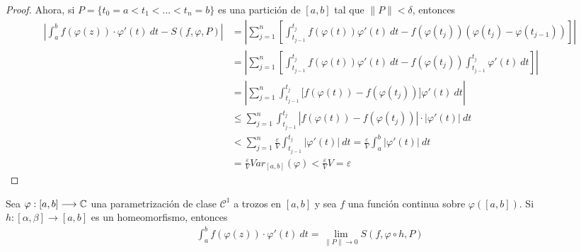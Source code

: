 \begin{proof}
    Ahora, si $P = \{t_0 = a < t_1 < ... < t_n = b\}$ es una partición de $[a,b]$ tal que $\|P\| < \delta$, entonces
    \begin{align*}
        \left| \int_{a}^{b}{f(\varphi(z))\cdot \varphi'(t) \ dt} - {S(f,\varphi,P)} \right| & = \left| \sum_{j=1}^{n} \left[ \int_{t_{j-1}}^{t_j} f(\varphi(t))\varphi'(t) \ dt - f(\varphi(t_j))(\varphi(t_j) - \varphi(t_{j-1})) \right] \right|     \\
                                                                                            & = \left| \sum_{j=1}^{n} \left[ \int_{t_{j-1}}^{t_j} f(\varphi(t))\varphi'(t) \ dt -f(\varphi(t_j))\int_{t_{j-1}}^{t_j}{\varphi'(t) \ dt} \right] \right| \\
                                                                                            & = \left| \sum_{j=1}^{n}  \int_{t_{j-1}}^{t_j} \Big[f(\varphi(t)) - f(\varphi(t_j))\Big]\varphi'(t) \ dt   \right|                                        \\
                                                                                            & \leq  \sum_{j=1}^{n}  \int_{t_{j-1}}^{t_j} |f(\varphi(t)) - f(\varphi(t_j))| \cdot |\varphi'(t)| \ dt                                                    \\
                                                                                            & <  \sum_{j=1}^{n}{\frac{\varepsilon}{V}\int_{t_{j-1}}^{t_j}|\varphi'(t)| \ dt} = \frac{\varepsilon}{V}\int_{a}^{b}{|\varphi'(t)| \ dt}                   \\
                                                                                            & = \frac{\varepsilon}{V}Var_{[a,b]}(\varphi) < \frac{\varepsilon}{V}V = \varepsilon
    \end{align*}
\end{proof}

\begin{lema}
    Sea $\varphi : [a,b] \longrightarrow \mathbb{C}$ una parametrización de clase $\mathcal{C}^1$ a trozos en $[a,b]$ y sea $f$ una función continua sobre $\varphi([a,b])$. Si $h : [\alpha,\beta] \longrightarrow [a,b]$ es un homeomorfismo, entonces
    \begin{align*}
        \int_{a}^{b}{f(\varphi(z))\cdot \varphi'(t) \ dt} = \lim_{\|P\| \to 0}{S(f,\varphi \circ h,P)}
    \end{align*}
\end{lema}

